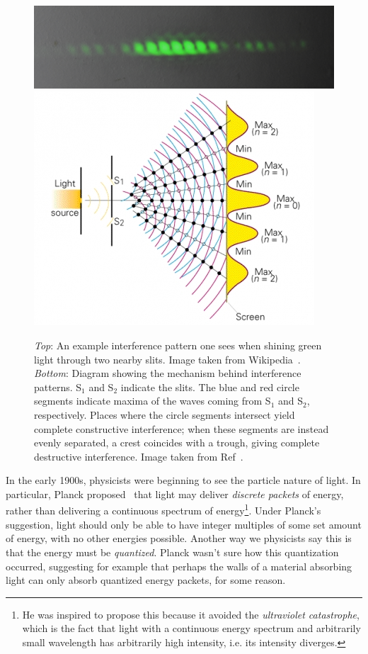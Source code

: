 \begin{figure}
  \centering
  \includegraphics[width=\linewidth]{figs/Youngs_slits.jpg}\\
  \includegraphics[width=\linewidth]{figs/twoSlitMechanism.jpg}
  \caption{{\it Top}: An example interference pattern one sees when shining green light
through two nearby slits. Image taken from Wikipedia~\cite{wiki:slit}.
{\it Bottom}: Diagram showing the mechanism behind interference patterns. S$_1$
and S$_2$ indicate the slits. The blue and red circle segments indicate maxima
of the waves coming from S$_1$ and S$_2$, respectively. Places where the circle
segments intersect yield complete constructive interference; when these segments are
instead evenly separated, a crest coincides with a trough, giving
complete destructive interference. Image taken from Ref~\cite{deutsch:slit}.}
  \label{fig:twoSlit}
\end{figure}

In the early 1900s, physicists were beginning to see the particle nature of
light. In particular, Planck proposed~\cite{Planck:1901tja}
that light may deliver {\it discrete packets} of
energy, rather than delivering a continuous spectrum of energy\footnote{He was
inspired to propose this because it avoided the
{\it ultraviolet catastrophe}, which is the fact that light with a continuous
energy spectrum and arbitrarily
small wavelength has arbitrarily high intensity, i.e. its intensity diverges.}.
Under Planck's suggestion, light should only be able to have integer multiples
of some set amount of energy, with no other energies possible. Another way we
physicists say this is that the energy must be {\it quantized}. Planck wasn't
sure how this quantization occurred, suggesting for example that perhaps the
walls of a material absorbing light can only absorb quantized energy packets,
for some reason.

